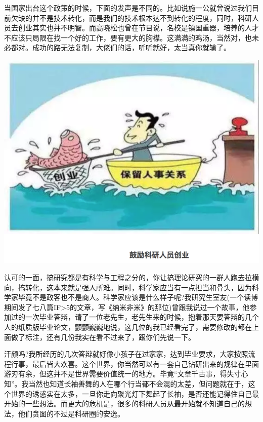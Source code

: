 \documentclass[]{book}
\begin{document}
当国家出台这个政策的时候，下面的发声是不同的。比如说施一公就曾说过我们目前欠缺的并不是技术转化，而是我们的技术根本达不到转化的程度，同时，科研人员去创业其实也并不明智。而高晓松也曾在节目说，名校是镇国重器，培养的人才不应该只局限在找一个好的工作，要有更大的胸襟。这满满的鸡汤，当然对，也未必都对。成功的路无法复制，大佬们的话，听听就好，太当真你就输了。

\includegraphics[width=8.33in]{images/kq1}

认可的一面，搞研究都是有科学与工程之分的，你让搞理论研究的一群人跑去拉横向，搞转化，这本来就是强人所难。同时，科学家应当有一点担当和骨头，因为科学家毕竟不是政客也不是商人。科学家应该是什么样子呢?我研究生室友(一个读博期间发了七八篇IF\textgreater{}5的文章，写《纳米非米》的那位)曾跟我说过一个故事，他参加过的一次毕业答辩，请了一位老先生，老先生来的时候，抱着那天要答辩的几个人的纸质版毕业论文，颤颤巍巍地说，这几位的我已经看完了，需要修改的都在上面做了标注，还有几份我实在看不过来了，跟你们先说一下。

汗颜吗?我所经历的几次答辩就好像小孩子在过家家，达到毕业要求，大家按照流程行事，最后皆大欢喜。这个世界，你当然可以有一套自己钻研出来的规律在里面游刃有余，但这并不是世界需要价值统一的地方。毕竟``文章千古事，得失寸心知''。我当然也知道长袖善舞的人在哪个行当都不会混的太差，但问题就在于，这个世界的诱惑实在太多，一旦你走向聚光灯下舞起了长袖，是否还能记得住自己最开始的一些想法。而更大的危机是，很多的科研人员从最开始就不知道自己的想法，他们贪图的不过是科研圈的安逸。
\end{document}
